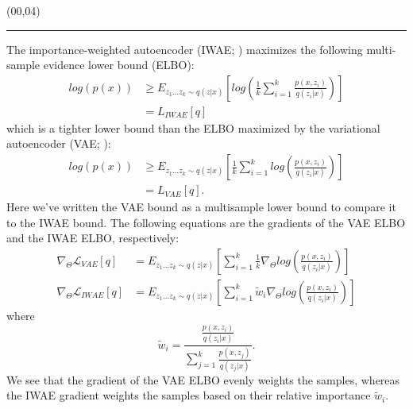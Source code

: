 \documentclass{article}
\newcommand{\eqname}[1]{\tag*{#1}}
\def\CHead#1{\begin{center}\noindent{\LARGE\color{DarkBlue} #1}\end{center}}
\renewcommand{\LARGE}{\fontsize{43}{54}\selectfont}
\begin{document}
\begin{textblock}{10}(00,04)
\CHead{Background} 
\hrule
\vspace{3mm}
The importance-weighted autoencoder (IWAE; \cite{burda2015importance}) maximizes the following multi-sample evidence lower bound (ELBO): 
\begin{align} 
    log(p(x)) & \geq E_{z_{1}...z_{k} \sim q(z|x)} \left[log\left(  \frac{1}{k}  \sum_{i=1}^k \frac{p(x,z_i)}{q(z_i|x)}  \right)  \right]  \nonumber \\
    &= L_{IWAE}[q] \nonumber %
\end{align}
which is a tighter lower bound than the ELBO maximized by the variational autoencoder (VAE; \cite{vae}):
\begin{align}
    log(p(x)) & \geq E_{z_{1}...z_{k} \sim q(z|x)} \left[  \frac{1}{k}\sum_{i=1}^k log\left(\frac{p(x,z_i)}{q(z_i|x)}  \right)  \right]  \nonumber \\
    &= L_{VAE}[q]. \nonumber %
\end{align}
Here we've written the VAE bound as a multisample lower bound to compare it to the IWAE bound. The following equations are the gradients of the VAE ELBO and the IWAE ELBO, respectively:
\begin{align} 
    \nabla_{\Theta} \mathcal{L}_{VAE}[q] &= E_{z_{1}...z_{k} \sim q(z|x)} \left[   \sum_{i=1}^k \frac{1}{k} \nabla_{\Theta} log\left(\frac{p(x,z_i)}{q(z_i|x)}  \right)  \right] \nonumber  \\ %
    \nabla_{\Theta} \mathcal{L}_{IWAE}[q] &= E_{z_{1}...z_{k} \sim q(z|x)} \left[  \sum_{i=1}^k \tilde{w}_i \nabla_{\Theta} log\left(\frac{p(x,z_i)}{q(z_i|x)}  \right)  \right] \nonumber %
\end{align}
where $$\tilde{w}_i = \frac{\frac{p(x,z_i)}{q(z_i|x)}}{\sum_{j=1}^k \frac{p(x,z_j)}{q(z_j|x)}}.$$
We see that the gradient of the VAE ELBO evenly weights the samples, whereas the IWAE gradient weights the samples based on their relative importance $\tilde{w}_i$.
\end{textblock}
\end{document}

